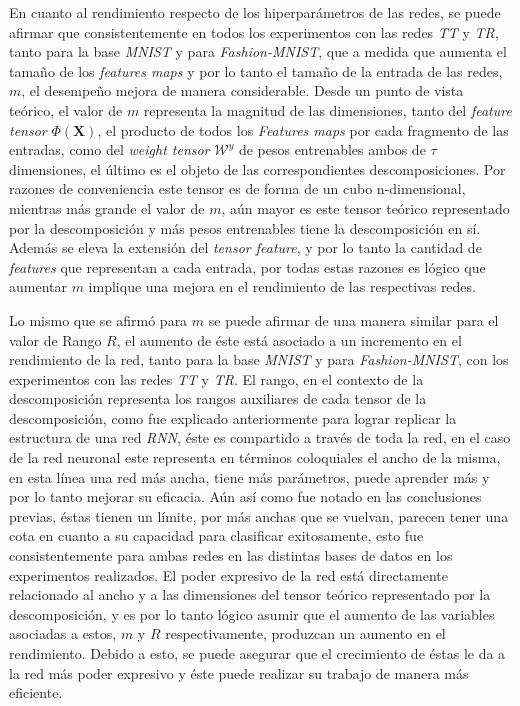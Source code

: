 \documentclass[spanish]{article}
\theoremstyle{definition}
\theoremstyle{remark}
\numberwithin{equation}{section}
\numberwithin{equation}{section} %
\begin{document}
\par
En cuanto al rendimiento respecto de los hiperparámetros de las redes, se puede afirmar que consistentemente en todos los experimentos con las redes \textit{TT} y \textit{TR}, tanto para la base \textit{MNIST} y para \textit{Fashion-MNIST}, que a medida que aumenta el tamaño de los \textit{features maps} y por lo tanto el tamaño de la entrada de las redes, $m$, el desempeño mejora de manera considerable. Desde un punto de vista teórico, el valor de $m$ representa la magnitud de las dimensiones, tanto del \textit{feature tensor} $\mathit{\Phi}(\boldsymbol{X})$, el producto de todos los \textit{Features maps} por cada fragmento de las entradas, como del \textit{weight tensor} $\mathcal{W}^{y}$ de pesos entrenables ambos de $\tau$ dimensiones, el último es el objeto de las correspondientes descomposiciones. Por razones de conveniencia este tensor es de forma de un cubo n-dimensional, mientras más grande el valor de $m$, aún mayor es este tensor teórico representado por la descomposición y más pesos entrenables tiene la descomposición en sí. Además se eleva la extensión del \textit{tensor feature}, y por lo tanto la cantidad de \textit{features} que representan a cada entrada, por todas estas razones es lógico que aumentar $m$ implique una mejora en el rendimiento de las respectivas redes.              
\par
Lo mismo que se afirmó para $m$ se puede afirmar de una manera similar para el valor de Rango $R$, el aumento de éste está asociado a un incremento en el rendimiento de la red, tanto para la base \textit{MNIST} y para \textit{Fashion-MNIST}, con los experimentos con las redes \textit{TT} y \textit{TR}. El rango, en el contexto de la descomposición representa los rangos auxiliares de cada tensor de la descomposición, como fue explicado anteriormente para lograr replicar la estructura de una red \textit{RNN}, éste es compartido a través de toda la red, en el caso de la red neuronal este representa en términos coloquiales el ancho de la misma, en esta línea una red más ancha, tiene más parámetros, puede aprender más y por lo tanto mejorar su eficacia. Aún así como fue notado en las conclusiones previas, éstas tienen un límite, por más anchas que se vuelvan, parecen tener una cota en cuanto a su capacidad para clasificar exitosamente, esto fue consistentemente para ambas redes en las distintas bases de datos en los experimentos realizados. El poder expresivo de la red está directamente relacionado al ancho y a las dimensiones del tensor teórico representado por la descomposición, y es por lo tanto lógico asumir que el aumento de las variables asociadas a estos, $m$ y $R$ respectivamente, produzcan un aumento en el rendimiento. Debido a esto, se puede asegurar que el crecimiento de éstas le da a la red más poder expresivo y éste puede realizar su trabajo de manera más eficiente.
\end{document}
